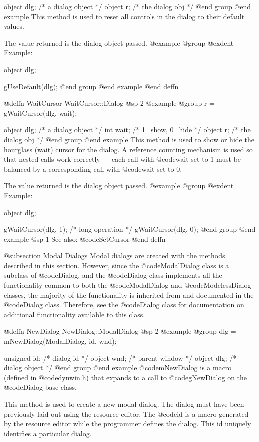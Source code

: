 object  dlg;   /*  a dialog object  */
object  r;     /*  the dialog obj   */
@end group
@end example
This method is used to reset all controls in the dialog to their
default values.

The value returned is the dialog object passed.
@example
@group
@exdent Example:

object  dlg;

gUseDefault(dlg);
@end group
@end example
@end deffn




@deffn {WaitCursor} WaitCursor::Dialog
@sp 2
@example
@group
r = gWaitCursor(dlg, wait);

object  dlg;    /*  a dialog object  */
int     wait;   /*  1=show, 0=hide   */
object  r;      /*  the dialog obj   */
@end group
@end example
This method is used to show or hide the hourglass (wait) cursor for the
dialog.  A reference counting mechanism is used so that nested calls
work correctly --- each call with @code{wait} set to 1 must be balanced
by a corresponding call with @code{wait} set to 0.

The value returned is the dialog object passed.
@example
@group
@exdent Example:

object  dlg;

gWaitCursor(dlg, 1);
/*  long operation  */
gWaitCursor(dlg, 0);
@end group
@end example
@sp 1
See also:  @code{SetCursor}
@end deffn




@subsection Modal Dialogs
Modal dialogs are created with the methods described in this section.
However, since the @code{ModalDialog} class is a subclass of @code{Dialog},
and the @code{Dialog} class implements all the functionality common to
both the @code{ModalDialog} and @code{ModelessDialog} classes, the
majority of the functionality is inherited from and documented in
the @code{Dialog} class.  Therefore, see the @code{Dialog} class
for documentation on additional functionality available to this class.



@deffn {NewDialog} NewDialog::ModalDialog
@sp 2
@example
@group
dlg = mNewDialog(ModalDialog, id, wnd);

unsigned  id;   /*  dialog id      */
object    wnd;  /*  parent window  */
object    dlg;  /*  dialog object  */
@end group
@end example
@code{mNewDialog} is a macro (defined in @code{dynwin.h}) that expands
to a call to @code{gNewDialog} on the @code{Dialog} base class.

This method is used to create a new modal dialog.  The dialog must have
been previously laid out using the resource editor.  The @code{id}
is a macro generated by the resource editor while the programmer defines
the dialog.  This id uniquely identifies a particular dialog.

